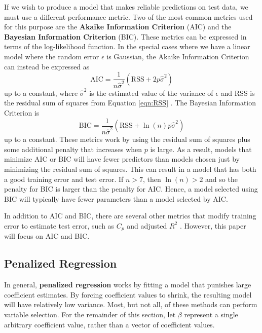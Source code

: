 \documentclass{article}
\newcommand{\RSS}{\text{RSS}}
\begin{document}
If we wish to produce a model that makes reliable predictions on test data, we must use a different performance metric. Two of the most common metrics used for this purpose are the \textbf{Akaike Information Criterion} (AIC) and the \textbf{Bayesian Information Criterion} (BIC). These metrics can be expressed in terms of the log-likelihood function. In the special cases where we have a linear model where the random error $\epsilon$ is Gaussian, the Akaike Information Criterion can instead be expressed as
\begin{equation}
	\text{AIC} = \frac{1}{n\hat{\sigma}^2}(\RSS + 2p\hat{\sigma}^2)
\end{equation}
up to a constant, where $\hat{\sigma}^2$ is the estimated value of the variance of $\epsilon$ and RSS is the residual sum of squares from Equation \ref{eqn:RSS} \cite{james2017islr}. The Bayesian Information Criterion is
\begin{equation}
	\text{BIC} = \frac{1}{n\hat{\sigma}^2}(\RSS + \ln(n)p\hat{\sigma}^2)
\end{equation}
up to a constant. These metrics work by using the residual sum of squares plus some additional penalty that increases when $p$ is large. As a result, models that minimize AIC or BIC will have fewer predictors than models chosen just by minimizing the residual sum of squares. This can result in a model that has both a good training error and test error. If $n>7$, then $\ln(n)>2$ and so the penalty for BIC is larger than the penalty for AIC. Hence, a model selected using BIC will typically have fewer parameters than a model selected by AIC.

In addition to AIC and BIC, there are several other metrics that modify training error to estimate test error, such as $C_p$ and adjusted $R^2$ \cite{james2017islr}. However, this paper will focus on AIC and BIC.
\subsection{Penalized Regression}

In general, \textbf{penalized regression} works by fitting a model that punishes large coefficient estimates. By forcing coefficient values to shrink, the resulting model will have relatively low variance. Most, but not all, of these methods can perform variable selection. For the remainder of this section, let $\beta$ represent a single arbitrary coefficient value, rather than a vector of coefficient values.
\end{document}
